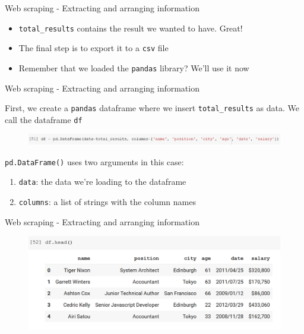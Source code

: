 \documentclass[aspectratio=169]{beamer}
\begin{document}
\begin{frame}{Web scraping - Extracting and arranging information}

	\begin{itemize}
		\item \texttt{total\_results} contains the result we wanted to have. Great!
		\item The final step is to export it to a \texttt{csv} file
		\item Remember that we loaded the \texttt{pandas} library? We'll use it now
	\end{itemize}

\end{frame}

\begin{frame}{Web scraping - Extracting and arranging information}

	First, we create a \texttt{pandas} dataframe where we insert \texttt{total\_results} as data. We call the dataframe \texttt{df}

	\begin{figure}
		\centering
		\includegraphics[width=\linewidth]{img/df.png}
	\end{figure}

	\texttt{pd.DataFrame()} uses two arguments in this case:

	\begin{enumerate}
		\item \texttt{data}: the data we're loading to the dataframe
		\item \texttt{columns}: a list of strings with the column names
	\end{enumerate}

\end{frame}

\begin{frame}{Web scraping - Extracting and arranging information}

	\begin{figure}
		\centering
		\includegraphics[width=\linewidth]{img/df_head.png}
	\end{figure}

\end{frame}
\end{document}
